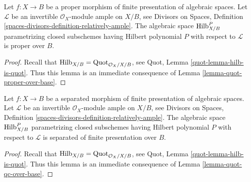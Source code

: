 \begin{lemma}
\label{lemma-hilb-proper-over-base}
Let $f : X \to B$ be a proper morphism of finite presentation
of algebraic spaces. Let $\mathcal{L}$ be an invertible
$\mathcal{O}_X$-module ample on $X/B$, see
Divisors on Spaces, Definition
\ref{spaces-divisors-definition-relatively-ample}.
The algebraic space $\mathrm{Hilb}^P_{X/B}$
parametrizing closed subschemes
having Hilbert polynomial $P$ with respect to $\mathcal{L}$
is proper over $B$.
\end{lemma}

\begin{proof}
Recall that $\mathrm{Hilb}_{X/B} = \mathrm{Quot}_{\mathcal{O}_X/X/B}$, see
Quot, Lemma \ref{quot-lemma-hilb-is-quot}.
Thus this lemma is an immediate consequence of
Lemma \ref{lemma-quot-proper-over-base}.
\end{proof}

\begin{lemma}
\label{lemma-hilb-qc-over-base}
Let $f : X \to B$ be a separated morphism of finite presentation
of algebraic spaces. Let $\mathcal{L}$ be an invertible
$\mathcal{O}_X$-module ample on $X/B$, see
Divisors on Spaces, Definition
\ref{spaces-divisors-definition-relatively-ample}.
The algebraic space $\mathrm{Hilb}^P_{X/B}$
parametrizing closed subschemes
having Hilbert polynomial $P$ with respect to $\mathcal{L}$
is separated of finite presentation over $B$.
\end{lemma}

\begin{proof}
Recall that $\mathrm{Hilb}_{X/B} = \mathrm{Quot}_{\mathcal{O}_X/X/B}$, see
Quot, Lemma \ref{quot-lemma-hilb-is-quot}.
Thus this lemma is an immediate consequence of
Lemma \ref{lemma-quot-qc-over-base}.
\end{proof}

